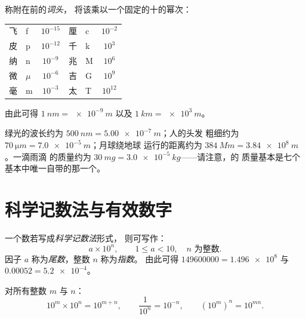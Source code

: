 \begin{definition}[国际单位制词头]\label{def:g10:orders-of-magnitude:prefixes}
称附在前的\emph{词头}，
将该乘以一个固定的十的幂次：
\begin{center}
\begin{tabular}{llc@{\qquad\qquad}llc}
飞 & f & $10^{-15}$ & 厘 & c & $10^{-2}$ \\
皮 & p & $10^{-12}$ & 千 & k & $10^{3}$  \\
纳 & n & $10^{-9}$  & 兆 & M & $10^{6}$  \\
微 & $\mu$ & $10^{-6}$ & 吉 & G & $10^{9}$ \\
毫 & m & $10^{-3}$  & 太 & T & $10^{12}$ \\
\end{tabular}
\end{center}
由此可得 $\qty{1}{nm} = \qty{e-9}{m}$ 以及 $\qty{1}{km} = \qty{e3}{m}$。
\end{definition}

\begin{example}[读懂词头]\label{ex:g10:orders-of-magnitude:prefixes}
绿光的波长约为 $\qty{500}{nm} = \qty{5.00e-7}{m}$；人的头发
粗细约为 $\qty{70}{\micro m} = \qty{7.0e-5}{m}$；月球绕地球
运行的距离约为 $\qty{384}{Mm} = \qty{3.84e8}{m}$。一滴雨滴
的质量约为 $\qty{30}{mg} = \qty{3.0e-5}{kg}$——请注意，的
质量基本是七个基本中唯一自带的那一个。
\end{example}

\section{科学记数法与有效数字}

\begin{definition}[科学记数法]\label{def:g10:orders-of-magnitude:scinot}
一个数若写成\emph{科学记数法}形式，
则可写作：
\[
a \times 10^{n}, \qquad 1 \leq a < 10, \quad n \text{ 为整数.}
\]
因子 $a$ 称为\emph{尾数}，整数
$n$ 称为\emph{指数}。
由此可得 $\num{149600000} = \num{1.496e8}$ 与
$\num{0.00052} = \num{5.2e-4}$。
\end{definition}

\begin{proposition}[十的幂的运算]\label{prop:g10:orders-of-magnitude:powers}
对所有整数 $m$ 与 $n$：
\[
10^{m} \times 10^{n} = 10^{m+n}, \qquad
\frac{1}{10^{n}} = 10^{-n}, \qquad
\left(10^{m}\right)^{n} = 10^{mn}.
\]
\end{proposition}

